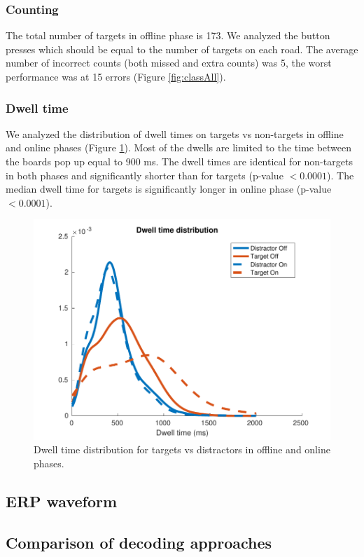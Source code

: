 \documentclass[12pt]{iopart}
\begin{document}
\subsubsection*{Counting}
The total number of targets in offline phase is 173.
We analyzed the button presses which should be equal to the number of targets
on each road.
The average number of incorrect counts (both missed and extra counts) was 5,
the worst performance was at 15 errors (Figure \ref{fig:classAll}).


\subsubsection*{Dwell time}
We analyzed the distribution of dwell times on targets vs non-targets
in offline and online phases (Figure \ref{fig:dwell}). 
Most of the dwells are limited to the time between the boards pop up equal to 900 ms.
The dwell times are identical for non-targets in both phases and significantly
shorter than for targets (p-value $< 0.0001$).
The median dwell time for targets is significantly longer in online phase (p-value $< 0.0001$).

\begin{figure}[!t]
    \includegraphics[trim={0cm 0cm 0cm 0cm},clip,width=0.6\columnwidth]{../images/DwelltimeDist_online_allmean.pdf}
    \caption{Dwell time distribution for targets vs distractors in offline and online phases.}
\label{fig:dwell}
\end{figure}

\subsection{ERP waveform}

\subsection{Comparison of decoding approaches}
\end{document}
